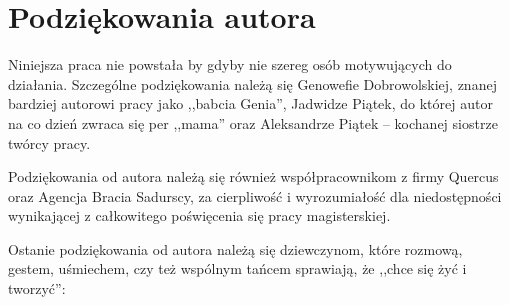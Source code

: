 \chapter{Podziękowania autora}
\label{cha:dodatekB}

Niniejsza praca nie powstała by gdyby nie szereg osób motywujących do działania. Szczególne podziękowania należą się Genowefie Dobrowolskiej, znanej bardziej autorowi pracy jako ,,babcia Genia'', Jadwidze Piątek, do której autor na co dzień zwraca się per ,,mama'' oraz Aleksandrze Piątek -- kochanej siostrze twórcy pracy.

Podziękowania od autora należą się również współpracownikom z firmy Quercus oraz Agencja Bracia Sadurscy, za cierpliwość i wyrozumiałość dla niedostępności wynikającej z całkowitego poświęcenia się pracy magisterskiej.

Ostanie podziękowania od autora należą się dziewczynom, które rozmową, gestem, uśmiechem, czy też wspólnym tańcem sprawiają, że ,,chce się żyć i tworzyć'':


